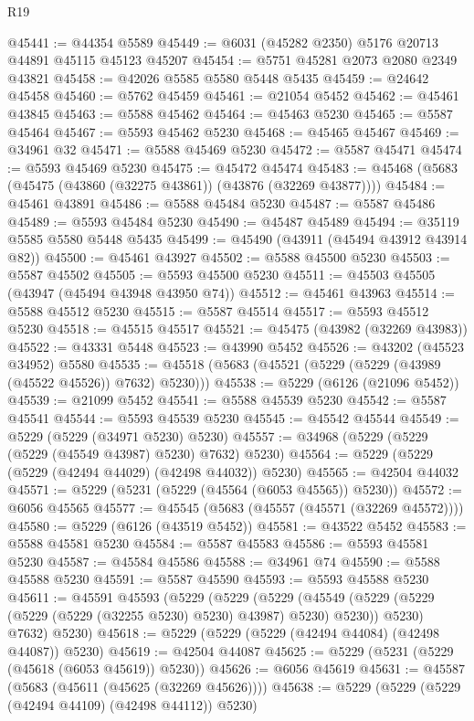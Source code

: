 \begin{lexlean}{R19}
\begin{coremodule}
@45441 := @44354 @5589
@45449 := @6031 (@45282 @2350) @5176 @20713 @44891 @45115 @45123 @45207
@45454 := @5751 @45281 @2073 @2080 @2349 @43821
@45458 := @42026 @5585 @5580 @5448 @5435
@45459 := @24642 @45458
@45460 := @5762 @45459
@45461 := @21054 @5452
@45462 := @45461 @43845
@45463 := @5588 @45462
@45464 := @45463 @5230
@45465 := @5587 @45464
@45467 := @5593 @45462 @5230
@45468 := @45465 @45467
@45469 := @34961 @32
@45471 := @5588 @45469 @5230
@45472 := @5587 @45471
@45474 := @5593 @45469 @5230
@45475 := @45472 @45474
@45483 := @45468 (@5683 (@45475 (@43860 (@32275 @43861)) (@43876 (@32269 @43877))))
@45484 := @45461 @43891
@45486 := @5588 @45484 @5230
@45487 := @5587 @45486
@45489 := @5593 @45484 @5230
@45490 := @45487 @45489
@45494 := @35119 @5585 @5580 @5448 @5435
@45499 := @45490 (@43911 (@45494 @43912 @43914 @82))
@45500 := @45461 @43927
@45502 := @5588 @45500 @5230
@45503 := @5587 @45502
@45505 := @5593 @45500 @5230
@45511 := @45503 @45505 (@43947 (@45494 @43948 @43950 @74))
@45512 := @45461 @43963
@45514 := @5588 @45512 @5230
@45515 := @5587 @45514
@45517 := @5593 @45512 @5230
@45518 := @45515 @45517
@45521 := @45475 (@43982 (@32269 @43983))
@45522 := @43331 @5448
@45523 := @43990 @5452
@45526 := @43202 (@45523 @34952) @5580
@45535 := @45518 (@5683 (@45521 (@5229 (@5229 (@43989 (@45522 @45526)) @7632) @5230)))
@45538 := @5229 (@6126 (@21096 @5452))
@45539 := @21099 @5452
@45541 := @5588 @45539 @5230
@45542 := @5587 @45541
@45544 := @5593 @45539 @5230
@45545 := @45542 @45544
@45549 := @5229 (@5229 (@34971 @5230) @5230)
@45557 := @34968 (@5229 (@5229 (@5229 (@45549 @43987) @5230) @7632) @5230)
@45564 := @5229 (@5229 (@5229 (@42494 @44029) (@42498 @44032)) @5230)
@45565 := @42504 @44032
@45571 := @5229 (@5231 (@5229 (@45564 (@6053 @45565)) @5230))
@45572 := @6056 @45565
@45577 := @45545 (@5683 (@45557 (@45571 (@32269 @45572))))
@45580 := @5229 (@6126 (@43519 @5452))
@45581 := @43522 @5452
@45583 := @5588 @45581 @5230
@45584 := @5587 @45583
@45586 := @5593 @45581 @5230
@45587 := @45584 @45586
@45588 := @34961 @74
@45590 := @5588 @45588 @5230
@45591 := @5587 @45590
@45593 := @5593 @45588 @5230
@45611 := @45591
    @45593
    (@5229
      (@5229
        (@5229
          (@45549 (@5229 (@5229 (@5229 (@5229 (@32255 @5230) @5230) @43987) @5230) @5230))
          @5230)
        @7632)
      @5230)
@45618 := @5229 (@5229 (@5229 (@42494 @44084) (@42498 @44087)) @5230)
@45619 := @42504 @44087
@45625 := @5229 (@5231 (@5229 (@45618 (@6053 @45619)) @5230))
@45626 := @6056 @45619
@45631 := @45587 (@5683 (@45611 (@45625 (@32269 @45626))))
@45638 := @5229 (@5229 (@5229 (@42494 @44109) (@42498 @44112)) @5230)

\end{coremodule}
\end{lexlean}

